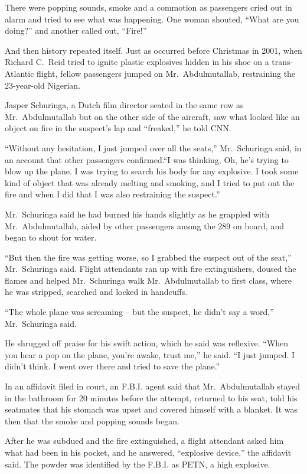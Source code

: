﻿\documentclass[12pt]{article}
\begin{document}
There were popping sounds, smoke and a commotion as passengers cried out in alarm and tried to see
what was happening. One woman shouted, ``What are you doing?'' and another called out, ``Fire!''

And then history repeated itself. Just as occurred before Christmas in 2001, when Richard C.~Reid
tried to ignite plastic explosives hidden in his shoe on a trans-Atlantic flight, fellow passengers
jumped on Mr.~Abdulmutallab, restraining the 23-year-old Nigerian.

Jasper Schuringa, a Dutch film director seated in the same row as Mr.~Abdulmutallab but on the other
side of the aircraft, saw what looked like an object on fire in the suspect's lap and ``freaked,''
he told CNN.

``Without any hesitation, I just jumped over all the seats,'' Mr.~Schuringa said, in an account that
other passengers confirmed.``I was thinking, Oh, he's trying to blow up the plane. I was trying to
search his body for any explosive. I took some kind of object that was already melting and smoking,
and I tried to put out the fire and when I did that I was also restraining the suspect.''

Mr.~Schuringa said he had burned his hands slightly as he grappled with Mr.~Abdulmutallab, aided by
other passengers among the 289 on board, and began to shout for water.

``But then the fire was getting worse, so I grabbed the suspect out of the seat,'' Mr.~Schuringa
said. Flight attendants ran up with fire extinguishers, doused the flames and helped Mr.~Schuringa
walk Mr.~Abdulmutallab to first class, where he was stripped, searched and locked in handcuffs.

``The whole plane was screaming -- but the suspect, he didn't say a word,'' Mr.~Schuringa said.

He shrugged off praise for his swift action, which he said was reflexive. ``When you hear a pop on
the plane, you're awake, trust me,'' he said. ``I just jumped. I didn't think. I went over there and
tried to save the plane.''

In an affidavit filed in court, an F.B.I. agent said that Mr.~Abdulmutallab stayed in the bathroom
for 20 minutes before the attempt, returned to his seat, told his seatmates that his stomach was
upset and covered himself with a blanket. It was then that the smoke and popping sounds began.

After he was subdued and the fire extinguished, a flight attendant asked him what had been in his
pocket, and he answered, ``explosive device,'' the affidavit said. The powder was identified by the
F.B.I. as PETN, a high explosive.
\end{document}
